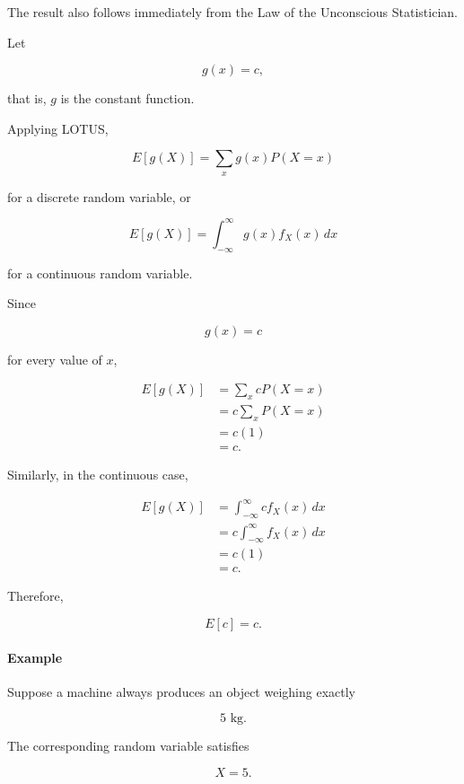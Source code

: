\documentclass[11pt]{article}
\begin{document}
\begin{mdframed}[
		linewidth=0.8pt,
		roundcorner=6pt,
		backgroundcolor=gray!5,
		linecolor=gray!60,
		innertopmargin=10pt,
		innerbottommargin=10pt,
		innerleftmargin=10pt,
		innerrightmargin=10pt
		]
		The result also follows immediately from the Law of the Unconscious
		Statistician.
		
		Let
		
		\[
		g(x)=c,
		\]
		
		that is, \(g\) is the constant function.
		
		Applying LOTUS,
		
		\[
		E[g(X)]
		=
		\sum_x
		g(x)P(X=x)
		\]
		
		for a discrete random variable, or
		
		\[
		E[g(X)]
		=
		\int_{-\infty}^{\infty}
		g(x)f_X(x)\,dx
		\]
		
		for a continuous random variable.
		
		Since
		
		\[
		g(x)=c
		\]
		
		for every value of \(x\),
		
		\[
		\begin{aligned}
			E[g(X)]
			&=
			\sum_x
			cP(X=x)
			\\[0.3cm]
			&=
			c
			\sum_x
			P(X=x)
			\\[0.3cm]
			&=
			c(1)
			\\[0.3cm]
			&=
			c.
		\end{aligned}
		\]
		
		Similarly, in the continuous case,
		
		\[
		\begin{aligned}
			E[g(X)]
			&=
			\int_{-\infty}^{\infty}
			cf_X(x)\,dx
			\\[0.3cm]
			&=
			c
			\int_{-\infty}^{\infty}
			f_X(x)\,dx
			\\[0.3cm]
			&=
			c(1)
			\\[0.3cm]
			&=
			c.
		\end{aligned}
		\]
		
		Therefore,
		
		\[
		\boxed{
			E[c]=c.
		}
		\]
		
		\bigskip
		
		\paragraph{Example}
		
		Suppose a machine always produces an object weighing exactly
		
		\[
		5\text{ kg}.
		\]
		
		The corresponding random variable satisfies
		
		\[
		X=5.
		\]
		

\end{mdframed}
\end{document}

